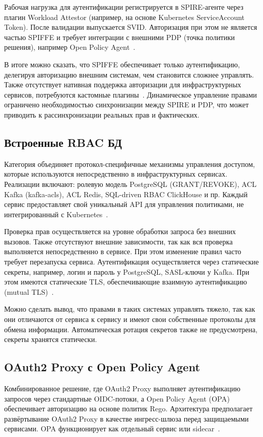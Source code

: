 Рабочая нагрузка для аутентификации регистрируется в SPIRE-агенте через плагин Workload Attestor (например, на основе Kubernetes ServiceAccount Token). После валидации выпускается SVID. Авторизация при этом не является частью SPIFFE и требует интеграции с внешними PDP (точка политики решения), например Open Policy Agent~\cite{spire}.

В итоге можно сказать, что SPIFFE обеспечивает только аутентификацию, делегируя авторизацию внешним системам, чем становится сложнее управлять. Также отсутствует нативная поддержка авторизации для инфраструктурных сервисов, потребуются кастомные плагины~\cite{spire}. Динамическое управление правами ограничено необходимостью синхронизации между SPIRE и PDP, что может приводить к рассинхронизации реальных прав и фактических.

\subsection{Встроенные RBAC БД}
Категория объединяет протокол-специфичные механизмы управления доступом, которые используются непосредственно в инфраструктурных сервисах. Реализации включают: ролевую модель PostgreSQL (GRANT/REVOKE), ACL Kafka (kafka-acls), ACL Redis, SQL-driven RBAC ClickHouse и пр. Каждый сервис предоставляет свой уникальный API для управления политиками, не интегрированный с Kubernetes~\cite{access_control}.

Проверка прав осуществляется на уровне обработки запроса без внешних вызовов. Также отсутствуют внешние зависимости, так как вся проверка выполняется непосредственно в сервисе. При этом изменение правил часто требует перезапуска сервиса.
Аутентификация осуществляется через статические секреты, например, логин и пароль у PostgreSQL, SASL-ключи у Kafka. При этом имеются статические TLS, обеспечивающие взаимную аутентификацию (mutual TLS)~\cite{access_control}.

Можно сделать вывод, что правами в таких системах управлять тяжело, так как они отличаются от сервиса к сервису и имеют свои собственные протоколы для обмена информации. Автоматическая ротация секретов также не предусмотрена, секреты хранятся статически.

\subsection{OAuth2 Proxy с Open Policy Agent}
Комбинированное решение, где OAuth2 Proxy выполняет аутентификацию запросов через стандартные OIDC-потоки, а Open Policy Agent (OPA) обеспечивает авторизацию на основе политик Rego. Архитектура предполагает развёртывание OAuth2 Proxy в качестве ингресс-шлюза перед защищаемыми сервисами. OPA функционирует как отдельный сервис или sidecar~\cite{access_control}.

